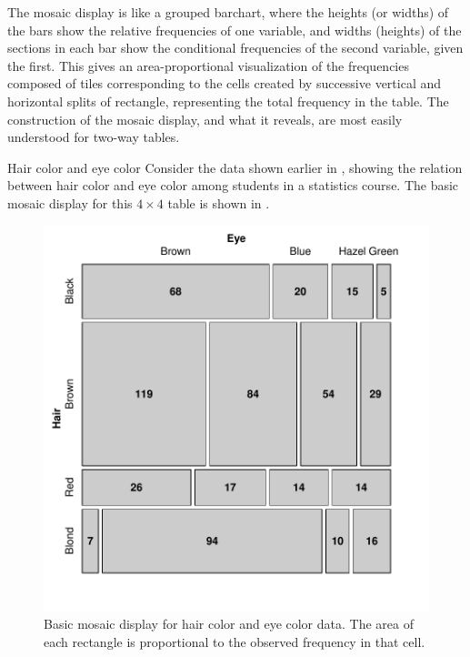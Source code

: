 \documentclass[11pt]{book}
\renewenvironment{knitrout}{\small\renewcommand{\baselinestretch}{.85}}{} %
\begin{document}
The mosaic display 
\citep{Friendly:92b,Friendly:94a,Friendly:97,HartiganKleiner:81,HartiganKleiner:84}
is like a grouped barchart,
where the heights (or widths) of the bars show the relative frequencies of one
variable, and widths (heights) of the sections in each bar show the
conditional frequencies of the second variable, given the first.
This gives an area-proportional visualization of the frequencies
composed of tiles corresponding to the cells created by successive
vertical and horizontal splits of rectangle, representing the total
frequency in the table.
The construction of the mosaic display, and what it reveals,
are most easily understood for two-way tables.

\begin{Example}[haireye2a]{Hair color and eye color}
Consider the data shown earlier in  ,
showing the relation between hair color and eye color among students
in a statistics course.  The basic mosaic display for this $4 \times 4$
table is shown in .

\begin{knitrout}
\color{fgcolor}\begin{figure}[!htbp]


\centerline{\includegraphics[width=.6\textwidth]{ch05/fig/haireye-mos1} }

\caption[Basic mosaic display for hair color and eye color data]{Basic mosaic display for hair color and eye color data.  The area of each rectangle is proportional to the observed frequency in that cell.\label{fig:haireye-mos1}}
\end{figure}



\end{knitrout}
\end{Example}
\end{document}
